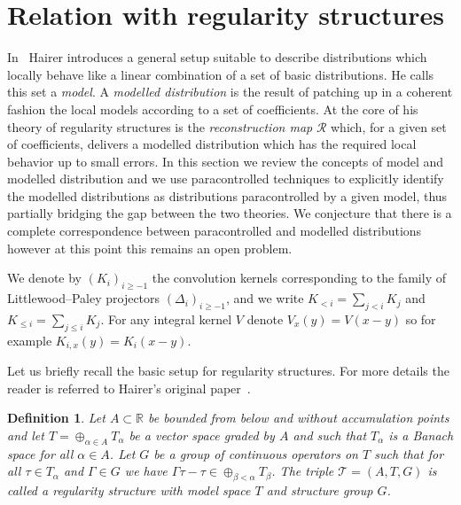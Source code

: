 \documentclass[11pt,a4paper]{article}
\newtheorem{definition}[theorem]{Definition}
\theoremstyle{remark}
\newcommand{\R}{\mathbb{R}}
\begin{document}
\section{Relation with regularity structures}

In~{\cite{Hairer2013a}} Hairer introduces a general setup suitable to
describe distributions which locally behave like a linear combination of a set
of basic distributions. He calls this set a \emph{model}. A \emph{modelled distribution} is the result of
patching up in a coherent fashion the local models according to a set of
coefficients. At the core of his theory of
regularity structures is the \emph{reconstruction map} $\mathcal{R}$
which, for a given set of coefficients, delivers a modelled distribution which
has the required local behavior up to small errors. In this section we review
the concepts of model and modelled distribution and we use paracontrolled
techniques to explicitly identify the modelled distributions as distributions
paracontrolled by a given model, thus partially bridging the gap between the two
theories. We conjecture that there is a complete correspondence between paracontrolled and modelled distributions however at this point this remains an open problem.

\medskip

We denote by $( K_{i} )_{i \geqslant -1}$ the convolution kernels corresponding to the family of Littlewood--Paley projectors $( \Delta_{i} )_{i \geqslant -1}$, and we write $K_{<i} = \sum_{j<i} K_j$ and $K_{\leqslant i} = \sum_{j \leqslant i} K_j$. For any integral kernel $V$ denote $V_{x} (
y ) =V ( x-y )$ so for example $K_{i,x} ( y ) =K_{i} ( x-y )$.

Let us briefly recall the basic setup for regularity structures. For more
details the reader is referred to Hairer's original paper~{\cite{Hairer2013a}}.

\begin{definition}
  Let $A \subset \R$ be bounded from below and without accumulation
  points and let $T =  \oplus_{\alpha \in A} T_{\alpha}$ be a vector space
  graded by $A$ and such that $T_{\alpha}$ is a Banach space for all $\alpha
  \in A$. Let $G$ be a group of continuous operators on $T$ such that for all
  $\tau \in T_{\alpha}$ and $\Gamma \in G$ we have $\Gamma \tau - \tau \in
  \oplus_{\beta < \alpha} T_{\beta}$. The triple $\mathcal{T}= ( A,T,G )$ is
  called a {\emph{regularity structure}} with \emph{model space} $T$ and \emph{structure
  group} $G$.
\end{definition}
\end{document}
